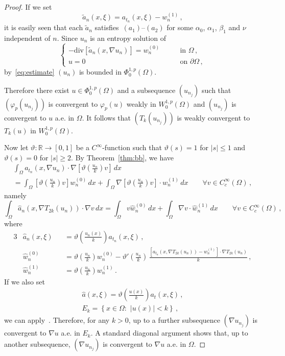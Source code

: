 \documentclass[twoside,reqno]{amsart}
\numberwithin{equation}{section}
\theoremstyle{definition}
\newcommand{\R}{\mathbb{R}}
\begin{document}
\begin{proof}
If we set
\[
\tilde{a}_n(x,\xi) = a_{t_n}(x,\xi) - w_n^{(1)}\,,
\]
it is easily seen that each $\tilde{a}_n$ satisfies~$(a_1)$--$(a_2)$
for some $\alpha_0$, $\alpha_1$, $\beta_1$ and $\nu$ independent
of $n$.
Since $u_n$ is an entropy solution of 
\[
\begin{cases}
- \mathrm{div}[\tilde{a}_n(x,\nabla u_n)] = w_n^{(0)} 
&\qquad\text{in $\Omega$}\,,\\
u=0
&\qquad\text{on $\partial\Omega$}\,,
\end{cases}
\]
by~\eqref{eq:estimate} $(u_n)$ is bounded in 
$\Phi^{1,p}_0(\Omega)$.
\par
Therefore there exist $u\in \Phi^{1,p}_0(\Omega)$ and a 
subsequence $(u_{n_j})$ such that $(\varphi_p(u_{n_j}))$ is
convergent to $\varphi_p(u)$ weakly in $W^{1,p}_0(\Omega)$ 
and $(u_{n_j})$ is convergent to $u$ a.e. in $\Omega$.
It follows that $(T_k(u_{n_j}))$ is weakly convergent
to $T_k(u)$ in $W^{1,p}_0(\Omega)$.
\par
Now let $\vartheta:\R\rightarrow[0,1]$ be a 
$C^\infty$-function such that 
$\vartheta(s)=1$ for $|s|\leq 1$ and
$\vartheta(s)=0$ for $|s|\geq 2$.
By Theorem~\ref{thm:bb}, we have
\begin{multline*}
\int_{\Omega} a_{t_n}(x,\nabla u_n) \cdot 
\nabla \left[\vartheta\left(\frac{u_n}{k}\right)v\right]\,dx\\
=
\int_{\Omega} 
\left[\vartheta\left(\frac{u_n}{k}\right)v\right] w_n^{(0)}\,dx
+ \int_{\Omega} 
\nabla\left[\vartheta\left(\frac{u_n}{k}\right)v\right]
\cdot w_n^{(1)}\,dx
\qquad\forall v\in C^\infty_c(\Omega)\,,
\end{multline*}
namely
\[
\int_{\Omega} \hat{a}_n(x,\nabla T_{2k}(u_n)) \cdot 
\nabla v\,dx
=
\int_{\Omega} v \hat{w}_n^{(0)}\,dx
+ \int_{\Omega} \nabla v\cdot \hat{w}_n^{(1)}\,dx
\qquad\forall v\in C^\infty_c(\Omega)\,,
\]
where
\begin{alignat*}{3}
&\hat{a}_n(x,\xi) &&= 
\vartheta\left(\frac{u_n(x)}{k}\right) a_{t_n}(x,\xi)\,,\\
&\hat{w}_n^{(0)} &&=
\vartheta\left(\frac{u_n}{k}\right) w_n^{(0)} -
\vartheta'\left(\frac{u_n}{k}\right)\,
\frac{[a_{t_n}(x,\nabla T_{2k}(u_n))-w_n^{(1)}] 
\cdot\nabla T_{2k}(u_n)}{k}\,,\\
&\hat{w}_n^{(1)} &&=
\vartheta\left(\frac{u_n}{k}\right) w_n^{(1)} \,.
\end{alignat*}
If we also set
\begin{gather*}
\hat{a}(x,\xi) = 
\vartheta\left(\frac{u(x)}{k}\right) a_{t}(x,\xi)\,,\\
E_k =
\left\{x\in\Omega:\,\,|u(x)| < k\right\}\,,
\end{gather*}
we can apply~\cite[Theorem~1]{dalmaso_murat1998}.
Therefore, for any $k>0$, up to a further subsequence  
$(\nabla u_{n_j})$ is convergent to 
$\nabla u$ a.e. in $E_k$.
A standard diagonal argument shows that, up to another
subsequence,  $(\nabla u_{n_j})$ is convergent to 
$\nabla u$ a.e. in $\Omega$.
\end{proof}
\end{document}
